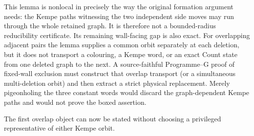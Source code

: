 This lemma is nonlocal in precisely the way the original formation argument
needs: the Kempe paths witnessing the two independent side moves may run
through the whole retained graph.  It is therefore not a bounded-radius
reducibility certificate.  Its remaining wall-facing gap is also exact.
For overlapping adjacent pairs the lemma supplies a common orbit separately
at each deletion, but it does not transport a colouring, a Kempe word, or an
exact Count state from one deleted graph to the next.  A source-faithful
Programme--G proof of fixed-wall exclusion must construct that overlap
transport (or a simultaneous multi-deletion orbit) and then extract a strict
physical replacement.  Merely pigeonholing the three constant words would
discard the graph-dependent Kempe paths and would not prove the boxed
assertion.

The first overlap object can now be stated without choosing a privileged
representative of either Kempe orbit.

